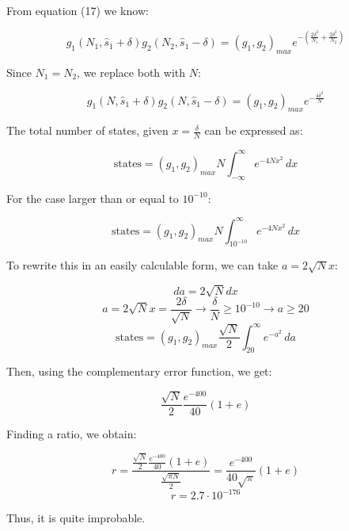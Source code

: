 \begin{enumerate}
    From equation (17) we know:

        $$g_1(N_1,\hat{s}_1+\delta)g_2(N_2,\hat{s}_1-\delta)=(g_1,g_2)_{max}e^{-\left( \frac{2\delta^2}{N_1}+\frac{2\delta^2}{N_2} \right)}$$

    Since $N_1=N_2$, we replace both with $N$:

        $$g_1(N,\hat{s}_1+\delta)g_2(N,\hat{s}_1-\delta)=(g_1,g_2)_{max}e^{-\frac{4\delta^2}{N}}$$

        The total number of states, given $x=\frac{\delta}{N}$ can be expressed as:

        $$\text{states} = (g_1,g_2)_{max}N\int_{-\infty}^{\infty}e^{-4Nx^2}\,dx$$

        For the case larger than or equal to $10^{-10}$:

        $$\text{states} = (g_1,g_2)_{max}N\int_{10^{-10}}^{\infty}e^{-4Nx^2}\,dx$$

        To rewrite this in an easily calculable form, we can take $a=2\sqrt{N}x$:

        $$da=2\sqrt{N}dx$$
        $$a=2\sqrt{N}x=\frac{2\delta}{\sqrt{N}}\to \frac{\delta}{N}\geq 10^{-10}\to a\geq 20$$
        $$\text{states} = (g_1,g_2)_{max}\frac{\sqrt{N}}{2}\int_{20}^{\infty}e^{-a^2}\,da$$

        Then, using the complementary error function, we get: 

        $$\frac{\sqrt{N}}{2}\frac{e^{-400}}{40}(1+e)$$

        Finding a ratio, we obtain:

        $$r=\frac{\frac{\sqrt{N}}{2}\frac{e^{-400}}{40}(1+e)}{\frac{\sqrt{\pi N}}{2}}=\frac{e^{-400}}{40\sqrt{\pi}}(1+e)$$
        $$r=2.7\cdot10^{-176}$$

        Thus, it is quite improbable.

\end{enumerate}




